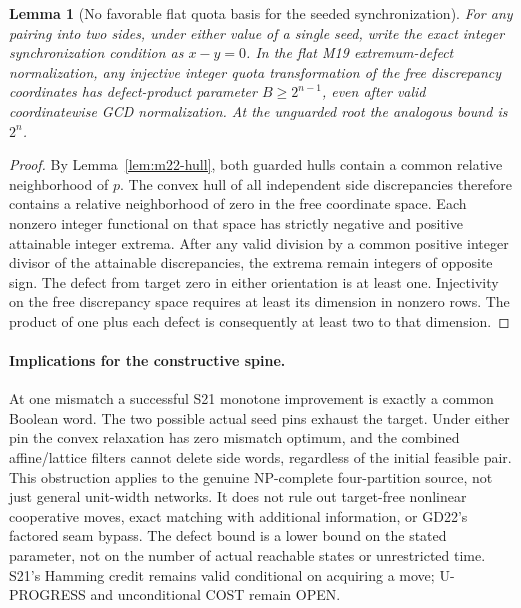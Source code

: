 \documentclass[11pt]{article}
\newtheorem{lemma}[theorem]{Lemma}
\begin{document}
\begin{lemma}[No favorable flat quota basis for the seeded synchronization]\label{lem:m22-defect}
For any pairing into two sides, under either value of a single seed, write the exact integer synchronization condition as $x-y=0$. In the flat M19 extremum-defect normalization, any injective integer quota transformation of the free discrepancy coordinates has defect-product parameter $B\ge2^{n-1}$, even after valid coordinatewise GCD normalization. At the unguarded root the analogous bound is $2^n$.
\end{lemma}
\begin{proof}
By Lemma~\ref{lem:m22-hull}, both guarded hulls contain a common relative neighborhood of $p$. The convex hull of all independent side discrepancies therefore contains a relative neighborhood of zero in the free coordinate space. Each nonzero integer functional on that space has strictly negative and positive attainable integer extrema. After any valid division by a common positive integer divisor of the attainable discrepancies, the extrema remain integers of opposite sign. The defect from target zero in either orientation is at least one. Injectivity on the free discrepancy space requires at least its dimension in nonzero rows. The product of one plus each defect is consequently at least two to that dimension.
\end{proof}

\paragraph{Implications for the constructive spine.}
At one mismatch a successful S21 monotone improvement is exactly a common Boolean word. The two possible actual seed pins exhaust the target. Under either pin the convex relaxation has zero mismatch optimum, and the combined affine/lattice filters cannot delete side words, regardless of the initial feasible pair. This obstruction applies to the genuine NP-complete four-partition source, not just general unit-width networks. It does not rule out target-free nonlinear cooperative moves, exact matching with additional information, or GD22's factored seam bypass. The defect bound is a lower bound on the stated parameter, not on the number of actual reachable states or unrestricted time. S21's Hamming credit remains valid conditional on acquiring a move; U-PROGRESS and unconditional COST remain OPEN.
\end{document}
